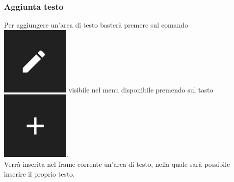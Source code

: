 \subsubsection{Aggiunta testo}
Per aggiungere un'area di testo basterà premere sul comando \includegraphics[scale=0.4]{img/add_text.png} visibile nel menu disponibile premendo sul tasto \includegraphics[scale=0.4]{img/add_object.png}. \\
Verrà inserita nel frame corrente un'area di testo, nella quale sarà possibile inserire il proprio testo.

